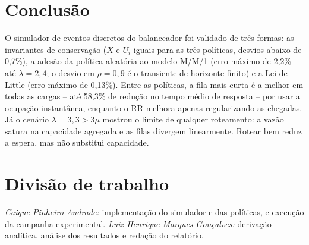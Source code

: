 \documentclass[conference,a4paper]{IEEEtran}
\begin{document}
\noindent\begin{minipage}{\columnwidth}
\section{Conclusão}

O simulador de eventos discretos do balanceador foi validado de três formas:
as invariantes de conservação ($X$ e $U_i$ iguais para as três políticas,
desvios abaixo de 0,7\%), a adesão da política aleatória ao modelo M/M/1
(erro máximo de 2,2\% até $\lambda=2{,}4$; o desvio em $\rho=0{,}9$ é o
transiente de horizonte finito) e a Lei de Little (erro máximo de 0,13\%). Entre as políticas, a fila mais curta é a
melhor em todas as cargas -- até 58,3\% de redução no tempo médio de
resposta -- por usar a ocupação instantânea, enquanto o RR melhora apenas
regularizando as chegadas. Já o cenário
$\lambda=3{,}3>3\mu$ mostrou o limite de qualquer roteamento: a vazão
satura na capacidade agregada e as filas divergem linearmente. Rotear bem
reduz a espera, mas não substitui capacidade.

\section*{Divisão de trabalho}
\noindent\textit{Caique Pinheiro Andrade:} implementação do simulador e das
políticas, e execução da campanha experimental.
\textit{Luiz Henrique Marques Gonçalves:} derivação analítica, análise dos
resultados e redação do relatório.
\end{minipage}
\end{document}
